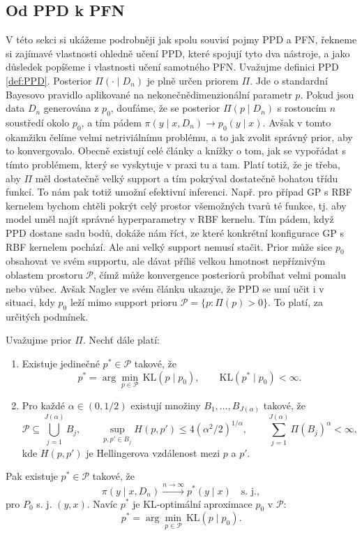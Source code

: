 \subsection{Od PPD k PFN}
\label{subsec:ppd-k-pfn}
V této sekci si ukážeme podrobněji jak spolu souvisí pojmy PPD a PFN, řekneme si zajímavé vlastnosti ohledně učení PPD, které spojují tyto dva nástroje, a jako důsledek popíšeme i vlastnosti učení samotného PFN.
Uvažujme definici PPD \ref{def:PPD}.
Posterior $\Pi(\cdot \mid D_n)$ je plně určen priorem $\Pi$.
Jde o standardní Bayesovo pravidlo aplikované na nekonečnědimenzionální parametr $p$. 
Pokud jsou data $D_n$ generována z $p_0$, doufáme, že se posterior $\Pi(p \mid D_n)$ s rostoucím $n$ soustředí okolo $p_0$, a tím pádem $\pi(y \mid x, D_n) \to p_0(y \mid x)$.
Avšak v tomto okamžiku čelíme velmi netriviálnímu problému, a to jak zvolit správný prior, aby to konvergovalo.
Obecně existují celé články a knížky o tom, jak se vypořádat s tímto problémem, který se vyskytuje v praxi tu a tam.
Platí totiž, že je třeba, aby $\Pi$ měl dostatečně velký support a tím pokrýval dostatečně bohatou třídu funkcí.
To nám pak totiž umožní efektivní inferenci.
Např. pro případ GP s RBF kernelem bychom chtěli pokrýt celý prostor všemožných tvarů té funkce, tj. aby model uměl najít správné hyperparametry v RBF kernelu.
Tím pádem, když PPD dostane sadu bodů, dokáže nám říct, ze které konkrétní konfigurace GP s RBF kernelem pochází.
Ale ani velký support nemusí stačit.
Prior může sice $p_0$ obsahovat ve svém supportu, ale dávat příliš velkou hmotnost nepříznivým oblastem prostoru $\mathcal{P}$, čímž může konvergence posteriorů probíhat velmi pomalu nebo vůbec.
Avšak Nagler ve svém článku ukazuje, že PPD se umí učit i v situaci, kdy $p_0$ leží mimo support prioru $\mathcal{P} = \{p : \Pi(p) > 0\}$.
To platí, za určitých podmínek.

\begin{theorem}
    Uvažujme prior $\Pi$. Nechť dále platí:
    \begin{enumerate}
        \item Existuje jedinečné $p^* \in \mathcal{P}$ takové, že
            $$p^* = \arg\min_{p \in \mathcal{P}} \, \mathrm{KL}(p \mid p_0), \qquad \mathrm{KL}(p^* \mid p_0) < \infty.$$
        \item Pro každé $\alpha \in (0, 1/2)$ existují množiny $B_1, \ldots, B_{J(\alpha)}$ takové, že
            $$\mathcal{P} \subseteq \bigcup_{j=1}^{J(\alpha)} B_j, \qquad \sup_{p, p' \in B_j} H(p, p') \leq 4(\alpha^2/2)^{1/\alpha}, \qquad \sum_{j=1}^{J(\alpha)} \Pi(B_j)^\alpha < \infty,$$
            kde $H(p, p')$ je Hellingerova vzdálenost mezi $p$ a $p'$.
    \end{enumerate}
    Pak existuje $p^* \in \mathcal{P}$ takové, že
    $$\pi(y \mid x, D_n) \xrightarrow{n \to \infty} p^*(y \mid x) \quad \text{s. j.},$$
    pro $P_0$ s. j. $(y, x)$. 
    Navíc $p^*$ je KL-optimální aproximace $p_0$ v $\mathcal{P}$:
    $$p^* = \arg\min_{p \in \mathcal{P}} \, \mathrm{KL}(p \mid p_0).$$
\label{theorem:PPDcanLearn}
\end{theorem}

